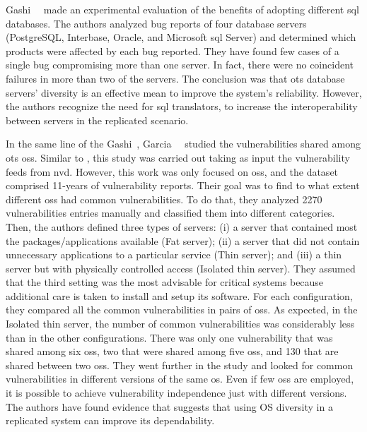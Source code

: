 Gashi~\etal{}~\cite{Gashi:2007} made an experimental evaluation of the benefits of adopting different \gls{sql} databases.
The authors analyzed bug reports of four database servers (PostgreSQL, Interbase, Oracle, and Microsoft \gls{sql} Server) and determined which products were affected by each bug reported. 
They have found few cases of a single bug compromising more than one server. 
In fact, there were no coincident failures in more than two of the servers.
The conclusion was that \gls{ots} database servers’ diversity is an effective mean to improve the system's reliability. 
However, the authors recognize the need for \gls{sql} translators, to increase the interoperability between servers in the replicated scenario.

In the same line of the Gashi~\etal{}, Garcia~\etal{}~\cite{Garcia:2012} studied the vulnerabilities shared among \gls{ots} \glspl{os}.
Similar to \cite{Han:2009}, this study was carried out taking as input the vulnerability feeds from \gls{nvd}. 
However, this work was only focused on \glspl{os}, and the dataset comprised 11-years of vulnerability reports. 
Their goal was to find to what extent different \glspl{os} had common vulnerabilities. 
To do that, they analyzed 2270 vulnerabilities entries manually and classified them into different categories. 
Then, the authors defined three types of servers: (i) a server that contained most the packages/applications available (Fat server); (ii) a server that did not contain unnecessary applications to a particular service (Thin server); and (iii) a thin server but with physically controlled access (Isolated thin server). 
They assumed that the third setting was the most advisable for critical systems because additional care is taken to install and setup its software. 
For each configuration, they compared all the common vulnerabilities in pairs of \glspl{os}. 
As expected, in the Isolated thin server, the number of common vulnerabilities was considerably less than in the other configurations. 
There was only one vulnerability that was shared among six \glspl{os}, two that were shared among five \glspl{os}, and 130 that are shared between two \glspl{os}. 
They went further in the study and looked for common vulnerabilities in different versions of the same \gls{os}. 
Even if few \glspl{os} are employed, it is possible to achieve vulnerability independence just with different versions.
The authors have found evidence that suggests that using OS diversity in a replicated system can improve its dependability. 



